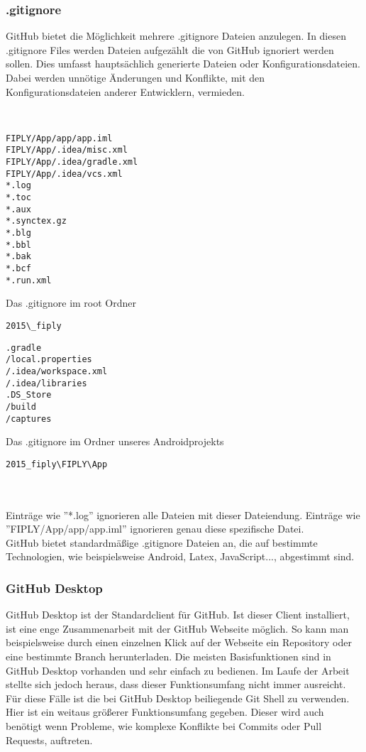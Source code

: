 \documentclass[FIPLY_base.tex]{subfiles}
\begin{document}
\newpage
\subsubsection{.gitignore}
GitHub bietet die Möglichkeit mehrere .gitignore Dateien anzulegen.
In diesen .gitignore Files werden Dateien aufgezählt die von GitHub ignoriert werden sollen. 
Dies umfasst hauptsächlich generierte Dateien oder Konfigurationsdateien.
Dabei werden unnötige Änderungen und Konflikte, mit den Konfigurationsdateien anderer Entwicklern, vermieden. 

\ \\
\begin{minipage}{.45\textwidth}
\begin{lstlisting}
FIPLY/App/app/app.iml
FIPLY/App/.idea/misc.xml
FIPLY/App/.idea/gradle.xml
FIPLY/App/.idea/vcs.xml
*.log
*.toc
*.aux
*.synctex.gz
*.blg
*.bbl
*.bak
*.bcf
*.run.xml
\end{lstlisting}
Das .gitignore im root Ordner \begin{verbatim}2015\_fiply\end{verbatim}
\end{minipage}\hfill
\begin{minipage}{.45\textwidth}
\begin{lstlisting}
.gradle
/local.properties
/.idea/workspace.xml
/.idea/libraries
.DS_Store
/build
/captures
\end{lstlisting}
Das .gitignore im Ordner unseres Androidprojekts \begin{verbatim}2015_fiply\FIPLY\App\end{verbatim} 
\end{minipage}
\ \\

\ \\
Einträge wie ''*.log'' ignorieren alle Dateien mit dieser Dateiendung. \newline
Einträge wie ''FIPLY/App/app/app.iml'' ignorieren genau diese spezifische Datei.
\ \\
GitHub bietet standardmäßige .gitignore Dateien an, die auf bestimmte Technologien, wie beispielsweise Android, Latex, JavaScript...,  abgestimmt sind.

\subsubsection{GitHub Desktop}
GitHub Desktop ist der Standardclient für GitHub.
Ist dieser Client installiert, ist eine enge Zusammenarbeit mit der GitHub Webseite möglich.
So kann man beispielsweise durch einen einzelnen Klick auf der Webseite ein Repository oder eine bestimmte Branch herunterladen.
Die meisten Basisfunktionen sind in GitHub Desktop vorhanden und sehr einfach zu bedienen.
Im Laufe der Arbeit stellte sich jedoch heraus, dass dieser Funktionsumfang nicht immer ausreicht.
Für diese Fälle ist die bei GitHub Desktop beiliegende Git Shell zu verwenden.
Hier ist ein weitaus größerer Funktionsumfang gegeben.
Dieser wird auch benötigt wenn Probleme, wie komplexe Konflikte bei Commits oder Pull Requests, auftreten.
\end{document}
